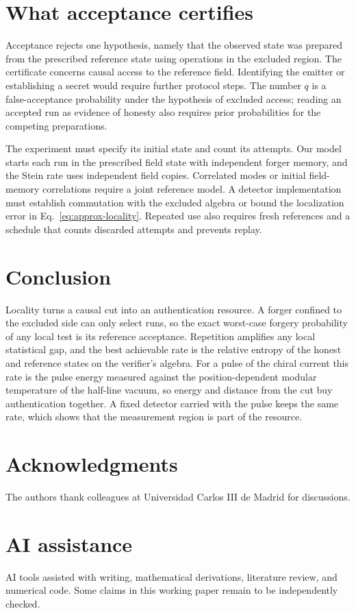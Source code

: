 \documentclass[11pt,a4paper]{article}
\begin{document}
\section{What acceptance certifies}
\label{sec:limits}

Acceptance rejects one hypothesis, namely that the observed state was prepared from the prescribed reference state using operations in the excluded region. The certificate concerns causal access to the reference field. Identifying the emitter or establishing a secret would require further protocol steps. The number $q$ is a false-acceptance probability under the hypothesis of excluded access; reading an accepted run as evidence of honesty also requires prior probabilities for the competing preparations.

The experiment must specify its initial state and count its attempts. Our model starts each run in the prescribed field state with independent forger memory, and the Stein rate uses independent field copies. Correlated modes or initial field-memory correlations require a joint reference model. A detector implementation must establish commutation with the excluded algebra or bound the localization error in Eq.~\eqref{eq:approx-locality}. Repeated use also requires fresh references and a schedule that counts discarded attempts and prevents replay.

\section{Conclusion}
\label{sec:conclusion}

Locality turns a causal cut into an authentication resource. A forger confined to the excluded side can only select runs, so the exact worst-case forgery probability of any local test is its reference acceptance. Repetition amplifies any local statistical gap, and the best achievable rate is the relative entropy of the honest and reference states on the verifier's algebra. For a pulse of the chiral current this rate is the pulse energy measured against the position-dependent modular temperature of the half-line vacuum, so energy and distance from the cut buy authentication together. A fixed detector carried with the pulse keeps the same rate, which shows that the measurement region is part of the resource.

\section*{Acknowledgments}
The authors thank colleagues at Universidad Carlos III de Madrid for discussions.

\section*{AI assistance}
AI tools assisted with writing, mathematical derivations, literature review, and numerical code. Some claims in this working paper remain to be independently checked.



\end{document}
